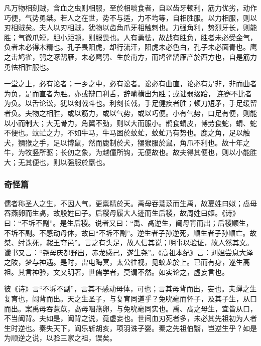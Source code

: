 \documentclass[]{article}
\begin{document}
凡万物相刻贼，含血之虫则相服，至於相啖食者，自以齿牙顿利，筋力优劣，动作巧便，气势勇桀。若人之在世，势不与适，力不均等，自相胜服。以力相服，则以刃相贼矣。夫人以刃相贼，犹物以齿角爪牙相触刺也。力强角利，势烈牙长，则能胜；气微爪短，胆小距顿，则服畏也。人有勇怯，故战有胜负，胜者未必受金气，负者未必得木精也。孔子畏阳虎，却行流汗，阳虎未必色白，孔子未必面青也。鹰之击鸠雀，鸮之啄鹄雁，未必鹰鸮、生於南方，而鸠雀鹄雁产於西方也，自是筋力勇怯相胜服也。

一堂之上，必有论者；一乡之中，必有讼者。讼必有曲直，论必有是非，非而曲者为负，是而直者为胜。亦或辩口利舌，辞喻横出为胜；或诎弱缀跲，连蹇不比者为负。以舌论讼，犹以剑戟斗也。利剑长戟，手足健疾者胜；顿刀短矛，手足缓留者负。夫物之相胜，或以筋力，或以气势，或以巧便。小有气势，口足有便，则能以小而制大；大无骨力，角翼不劲，则以大而服小。鹊食蝟皮，博劳食蛇，蝟、蛇不便也。蚊虻之力，不如牛马，牛马困於蚊虻，蚊虻乃有势也。鹿之角，足以触犬，獼猴之手，足以博鼠，然而鹿制於犬，獼猴服於鼠，角爪不利也。故十年之牛，为牧竖所驱；长仞之象，为越僮所钩，无便故也。故夫得其便也，则以小能胜大；无其便也，则以强服於羸也。

\hypertarget{header-n140}{%
\subsubsection{奇怪篇}\label{header-n140}}

儒者称圣人之生，不因人气，更禀精於天。禹母吞薏苡而生禹，故夏姓曰姒；卨母吞燕卵而生卨，故殷姓曰子。后稷母履大人迹而生后稷，故周姓曰姬。《诗》曰：``不坼不副''。是生后稷。说者又曰：``禹、卨逆生，闿母背而出；后稷顺生，不坼不副。不感动母体，故曰``不坼不副''。逆生者子孙逆死，顺生者子孙顺亡。故桀、纣诛死，赧王夺邑''。言之有头足，故人信其说；明事以验证，故人然其文。谶书又言：``尧母庆都野出，赤龙感己，遂生尧''。《高祖本纪》言：刘媪尝息大泽之陂，梦与神遇。是时，雷电晦冥，太公往视，见蛟龙於上。已而有身，遂生高祖。其言神验，文又明著，世儒学者，莫谓不然。如实论之，虚妄言也。

彼《诗》言``不坼不副''，言其不感动母体，可也；言其母背而出，妄也。夫蝉之生复育也，闿背而出。天之生圣子，与复育同道乎？兔吮毫而怀子，及其子生，从口而出。案禹母吞薏苡，卨母咽燕卵，与兔吮毫同实也。禹、卨之母生，宜皆从口，不当闿背。夫如是，闿背之说，竟虚妄也。世间血刃死者多，未必其先祖初为人者生时逆也。秦失天下，阎乐斩胡亥，项羽诛子婴。秦之先祖伯翳，岂逆生乎？如是为顺逆之说，以验三家之祖，误矣。
\end{document}
